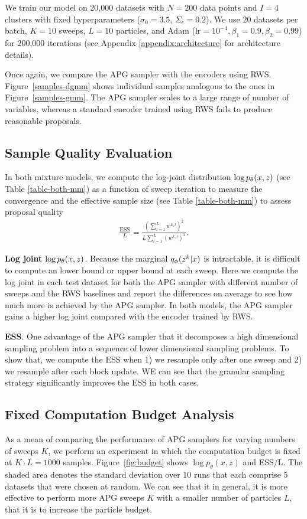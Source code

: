 \documentclass{article}
\theoremstyle{definition}
\begin{document}
We train our model on 20,000 datasets with $N = 200$ data points and $I = 4$ clusters with fixed hyperparameters ($\sigma_0 = 3.5$, $\Sigma_{\epsilon} = 0.2$). We use $20$ datasets per batch, $K=10$ sweeps, $L=10$ particles, and Adam ($\mathrm{lr} = 10^{-4}, \beta_1 = 0.9, \beta_2 = 0.99$) for 200,000 iterations (see Appendix \ref{appendix:architecture} for architecture details).

Once again, we compare the APG sampler with the encoders using RWS. Figure~\ref{samples-dgmm} shows individual samples analogous to the ones in Figure~\ref{samples-gmm}. The APG sampler scales to a large range of number of variables, whereas a standard encoder trained using RWS fails to produce reasonable proposals.

\subsection{Sample Quality Evaluation}
In both mixture models, we compute the log-joint distribution $\log p_\theta(x, z)$ (see Table \ref{table-both-mm}) as a function of sweep iteration to measure the convergence and the effective sample size (see Table \ref{table-both-mm}) to assess proposal quality
\begin{align}
\label{ess-eq}
    \frac{\text{ESS}}{L} 
    = 
    \frac{(\sum_{l=1}^L w^{k,l})^2}
         {L \sum_{l=1}^L (w^{k,l})^2}
    .
\end{align}


\textbf{Log joint} $\log p_\theta(x, z)$. Because the marginal $q_\phi(z^k | x)$ is intractable, it is difficult to compute an lower bound or upper bound at each sweep. Here we compute the log joint in each test dataset for both the APG sampler with different number of sweeps and the RWS baselines and report the differences on average to see how much more is achieved by the APG sampler. In both models, the APG sampler gains a higher log joint compared with the encoder trained by RWS.

\textbf{ESS}. One advantage of the APG sampler that it decomposes a high dimensional sampling problem into a sequence of lower dimensional sampling problems. To show that, we compute the ESS when 1) we resample only after one sweep and 2) we resample after each block update. WE can see that the granular sampling strategy significantly improves the ESS in both cases.

\subsection{Fixed Computation Budget Analysis}
As a mean of comparing the performance of APG samplers for varying numbers of sweeps $K$, we perform an experiment in which the computation budget is fixed at $K \cdot L = 1000$ samples. Figure~\ref{fig:budget} shows $\log p_\theta(x, z)$ and ESS/L. The shaded area denotes the standard deviation over 10 runs that each comprise 5 datasets that were chosen at random. We can see that it in general, it is more effective to perform more APG sweeps $K$ with a smaller number of particles $L$, that it is to increase the particle budget. 
\end{document}
